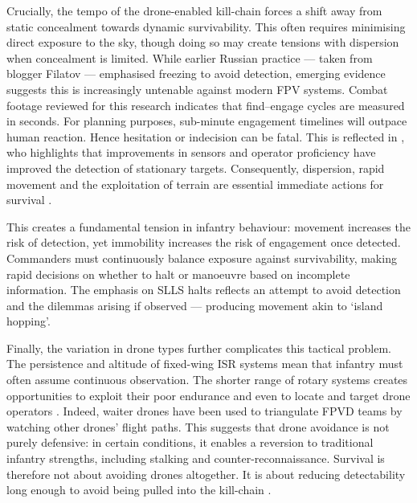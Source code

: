 {Crucially, the tempo of the drone-enabled kill-chain forces a shift away from static concealment towards dynamic survivability. This often requires minimising direct exposure to the sky, though doing so may create tensions with dispersion when concealment is limited. While earlier Russian practice --- taken from blogger Filatov --- emphasised freezing to avoid detection, emerging evidence suggests this is increasingly untenable against modern FPV systems. Combat footage reviewed for this research indicates that find--engage cycles are measured in seconds. For planning purposes, sub-minute engagement timelines will outpace human reaction. Hence hesitation or indecision can be fatal. This is reflected in \textcite{Filatov_fpv}, who highlights that improvements in sensors and operator proficiency have improved the detection of stationary targets. Consequently, dispersion, rapid movement and the exploitation of terrain are essential immediate actions for survival \parencite{civdiv_11}.

This creates a fundamental tension in infantry behaviour: movement increases the risk of detection, yet immobility increases the risk of engagement once detected. Commanders must continuously balance exposure against survivability, making rapid decisions on whether to halt or manoeuvre based on incomplete information. The emphasis on SLLS halts reflects an attempt to avoid detection and the dilemmas arising if observed --- producing movement akin to `island hopping'.

Finally, the variation in drone types further complicates this tactical problem. The persistence and altitude of fixed-wing ISR systems mean that infantry must often assume continuous observation. The shorter range of rotary systems creates opportunities to exploit their poor endurance and even to locate and target drone operators \parencite[6:52--13:45]{garand_thumb_ti_2025_2_27}. Indeed, waiter drones have been used to triangulate FPVD teams by watching other drones' flight paths. This suggests that drone avoidance is not purely defensive: in certain conditions, it enables a reversion to traditional infantry strengths, including stalking and counter-reconnaissance. Survival is therefore not about avoiding drones altogether. It is about reducing detectability long enough to avoid being pulled into the kill-chain \parencite[29]{neron_bancel_2024_05_27}.


}
